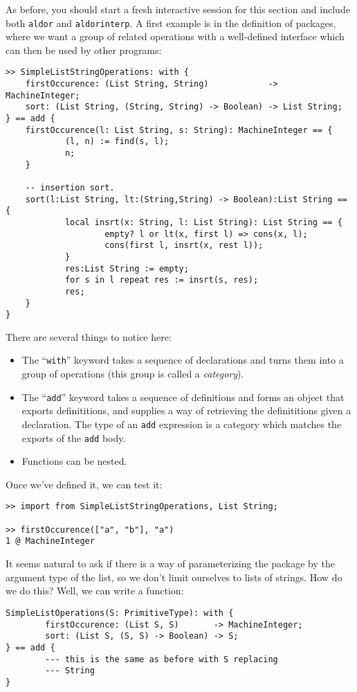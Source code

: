 \documentclass{article}
\begin{document}
As before,
you should start a fresh interactive session for this section and
include both {\tt aldor} and {\tt aldorinterp}.
A first example is in the definition of packages, where we want a
group of related operations with a well-defined interface which can
then be used by other programs:
\begin{small}
\begin{verbatim}
>> SimpleListStringOperations: with {
    firstOccurence: (List String, String)            -> MachineInteger;
    sort: (List String, (String, String) -> Boolean) -> List String;
} == add {
    firstOccurence(l: List String, s: String): MachineInteger == {
            (l, n) := find(s, l);
            n;
    }

    -- insertion sort.
    sort(l:List String, lt:(String,String) -> Boolean):List String == {
            local insrt(x: String, l: List String): List String == {
                    empty? l or lt(x, first l) => cons(x, l);
                    cons(first l, insrt(x, rest l));
            }
            res:List String := empty;
            for s in l repeat res := insrt(s, res);
            res;
    }
}
\end{verbatim}
\end{small}

There are several things to notice here:
\begin{itemize}
\item The ``{\tt with}'' keyword takes a sequence of declarations and
turns them into a group of operations (this group is called a {\em
category}).
\item The ``{\tt add}'' keyword takes a sequence of definitions and
forms an object that exports definititions, and supplies a way of
retrieving the definititions given a declaration.  The type of an {\tt add}
expression is a category which matches the exports of the {\tt add} body.
\item Functions can be nested.
\end{itemize}

Once we've defined it, we can test it:

\begin{small}
\begin{verbatim}
>> import from SimpleListStringOperations, List String;

>> firstOccurence(["a", "b"], "a")
1 @ MachineInteger
\end{verbatim}
\end{small}

It seems natural to ask if there is a way of parameterizing the
package by the argument type of the list, so we don't limit ourselves
to lists of strings.  How do we do this?  Well, we can write a
function:
\begin{small}
\begin{verbatim}
SimpleListOperations(S: PrimitiveType): with {
        firstOccurence: (List S, S)       -> MachineInteger;
        sort: (List S, (S, S) -> Boolean) -> S;
} == add {
        --- this is the same as before with S replacing
        --- String
}
\end{verbatim}
\end{small}
\end{document}
